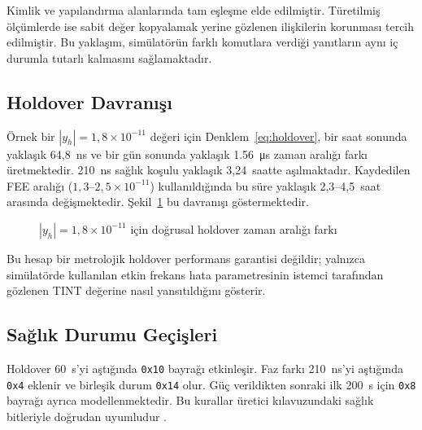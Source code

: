\documentclass[9pt,twocolumn,a4paper]{extarticle}
\begin{document}
Kimlik ve yapılandırma alanlarında tam eşleşme elde edilmiştir. Türetilmiş ölçümlerde ise sabit değer kopyalamak yerine gözlenen ilişkilerin korunması tercih edilmiştir. Bu yaklaşım, simülatörün farklı komutlara verdiği yanıtların aynı iç durumla tutarlı kalmasını sağlamaktadır.

\subsection{Holdover Davranışı}
Örnek bir $|y_h|=1{,}8\times10^{-11}$ değeri için Denklem~\ref{eq:holdover}, bir saat sonunda yaklaşık 64,8~ns ve bir gün sonunda yaklaşık \SI{1.56}{\micro\second} zaman aralığı farkı üretmektedir. 210~ns sağlık koşulu yaklaşık 3,24~saatte aşılmaktadır. Kaydedilen FEE aralığı ($1{,}3$--$2{,}5\times10^{-11}$) kullanıldığında bu süre yaklaşık 2,3--4,5~saat arasında değişmektedir. Şekil~\ref{fig:holdover} bu davranışı göstermektedir.

\begin{figure}[t]
\centering
{}
\caption{$|y_h|=1{,}8\times10^{-11}$ için doğrusal holdover zaman aralığı farkı}
\label{fig:holdover}
\end{figure}

Bu hesap bir metrolojik holdover performans garantisi değildir; yalnızca simülatörde kullanılan etkin frekans hata parametresinin istemci tarafından gözlenen TINT değerine nasıl yansıtıldığını gösterir.

\subsection{Sağlık Durumu Geçişleri}
Holdover 60~s'yi aştığında \texttt{0x10} bayrağı etkinleşir. Faz farkı 210~ns'yi aştığında \texttt{0x4} eklenir ve birleşik durum \texttt{0x14} olur. Güç verildikten sonraki ilk 200~s için \texttt{0x8} bayrağı ayrıca modellenmektedir. Bu kurallar üretici kılavuzundaki sağlık bitleriyle doğrudan uyumludur \cite{jlt2015}.
\end{document}
